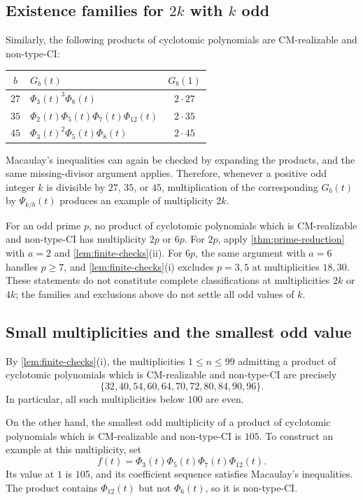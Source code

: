 \documentclass[11pt,a4paper]{amsart}
\theoremstyle{definition}
\theoremstyle{remark}
\begin{document}
\subsection{Existence families for \texorpdfstring{$2k$}{2k} with \texorpdfstring{$k$}{k} odd}
Similarly, the following products of cyclotomic polynomials are CM-realizable and non-type-CI:
\begin{center}
\begin{tabular}{@{}clc@{}}
\toprule
$b$ & $G_b(t)$ & $G_b(1)$\\
\midrule
$27$ & $\Phi_3(t)^3\Phi_8(t)$ & $2\cdot27$\\
$35$ & $\Phi_2(t)\Phi_5(t)\Phi_7(t)\Phi_{12}(t)$ & $2\cdot35$\\
$45$ & $\Phi_3(t)^2\Phi_5(t)\Phi_8(t)$ & $2\cdot45$\\
\bottomrule
\end{tabular}
\end{center}
Macaulay's inequalities can again be checked by expanding the products, and the same missing-divisor argument applies. Therefore, whenever a positive odd integer $k$ is divisible by $27$, $35$, or $45$, multiplication of the corresponding $G_b(t)$ by $\Psi_{k/b}(t)$ produces an example of multiplicity $2k$.

For an odd prime $p$, no product of cyclotomic polynomials which is CM-realizable and non-type-CI has multiplicity $2p$ or $6p$. For $2p$, apply \cref{thm:prime-reduction} with $a=2$ and \cref{lem:finite-checks}\textup{(ii)}. For $6p$, the same argument with $a=6$ handles $p\ge7$, and \cref{lem:finite-checks}\textup{(i)} excludes $p=3,5$ at multiplicities $18,30$. These statements do not constitute complete classifications at multiplicities $2k$ or $4k$; the families and exclusions above do not settle all odd values of $k$.

\subsection{Small multiplicities and the smallest odd value}
By \cref{lem:finite-checks}\textup{(i)}, the multiplicities $1\le n\le99$ admitting a product of cyclotomic polynomials which is CM-realizable and non-type-CI are precisely
\[\{32,40,54,60,64,70,72,80,84,90,96\}.\]
In particular, all such multiplicities below $100$ are even.

On the other hand, the smallest odd multiplicity of a product of cyclotomic polynomials which is CM-realizable and non-type-CI is $105$.
To construct an example at this multiplicity, set \[f(t)=\Phi_3(t)\Phi_5(t)\Phi_7(t)\Phi_{12}(t).\] Its value at $1$ is $105$,
and its coefficient sequence satisfies Macaulay's inequalities. The product contains $\Phi_{12}(t)$ but not $\Phi_6(t)$, so it is non-type-CI.
\end{document}
